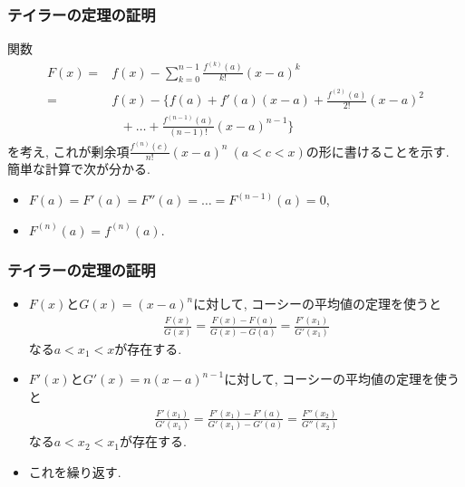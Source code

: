 \begin{frame}
\frametitle{テイラーの定理の証明}

関数 \vspace{-5mm}
\begin{align*}
 F(x) =&  f(x)-\sum_{k=0}^{n-1}\frac{f^{(k)}(a)}{k!}(x-a)^k \\
=&   f(x)-\big\{ f(a)+ f'(a)(x-a) + \frac{f^{(2)}(a)}{2!}(x-a)^2   \\
& \ \ \ + \dots + \frac{f^{(n-1)}(a)}{(n-1)!}(x-a)^{n-1}\big\}
\end{align*}
を考え, これが剰余項$\frac{f^{(n)}(c)}{n!}(x-a)^n \ (a<c<x)$の形に書けることを示す. 
簡単な計算で次が分かる. 
\begin{itemize}
\item $F(a)=F'(a)=F''(a)= \dots =F^{(n-1)}(a)=0$, 
\item $F^{(n)}(a)=f^{(n)}(a)$. 
\end{itemize}  

\end{frame}





\begin{frame}
\frametitle{テイラーの定理の証明}

\begin{itemize}
\item $F(x)$と$G(x)=(x-a)^n$に対して, コーシーの平均値の定理を使うと
\begin{align*}
\frac{F(x)}{G(x)}=\frac{F(x)-F(a)}{G(x)-G(a)}=\frac{F'(x_1)}{G'(x_1)}
\end{align*}
なる$a<x_1<x$が存在する. 
\item $F'(x)$と$G'(x)=n(x-a)^{n-1}$に対して, コーシーの平均値の定理を使うと
\begin{align*}
\frac{F'(x_1)}{G'(x_1)}=\frac{F'(x_1)-F'(a)}{G'(x_1)-G'(a)}=\frac{F''(x_2)}{G''(x_2)}
\end{align*}
なる$a<x_2<x_1$が存在する. 
\item これを繰り返す. 
\end{itemize}
\end{frame}





